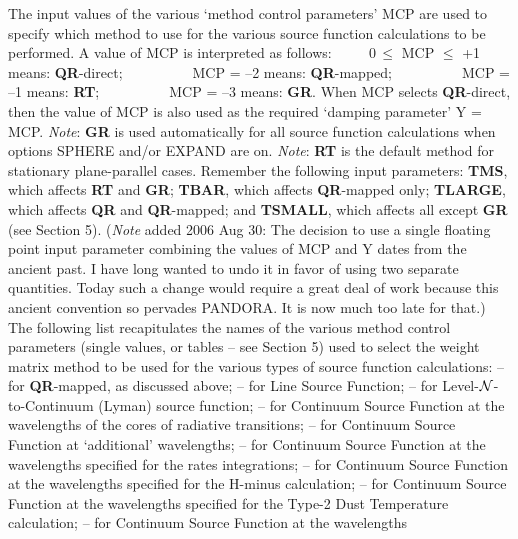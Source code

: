 The input values of the various `method control parameters' MCP are used
to specify which method to use for the various source function calculations
to be performed. A value of MCP is interpreted as follows: 
\blankline \noindent
$\qquad$ $0 \, \leq$ MCP $\leq$ +1 means: {\bf QR}-direct; \np
$\qquad$ $\phantom{0 \, \leq}$ MCP = --2 means: {\bf QR}-mapped; \np
$\qquad$ $\phantom{0 \, \leq}$ MCP = --1 means: {\bf RT}; \np
$\qquad$ $\phantom{0 \, \leq}$ MCP = --3 means: {\bf GR}.
\blankline 
{} When MCP selects {\bf QR}-direct, then the value of
MCP is also used as the required `damping parameter' Y = MCP. \np
{\it Note}: {\bf GR} is used automatically for all source
function calculations when options SPHERE and/or EXPAND are on. \np
{\it Note}: {\bf RT} is the default method for stationary
plane-parallel cases.
\blankline
Remember the following input parameters: {\bf TMS}, which affects
{\bf RT} and {\bf GR}; {\bf TBAR}, which affects {\bf QR}-mapped only;
{\bf TLARGE}, which affects {\bf QR} and {\bf QR}-mapped;
and {\bf TSMALL}, which affects all except {\bf GR} (see Section 5).
\blankline
({\it Note} added 2006 Aug 30: The decision to use a single floating
point input parameter combining the values of MCP and Y dates from the
ancient past. I have long wanted to undo it in favor of using two separate
quantities. Today such a change would require a great deal of work because
this ancient convention so pervades PANDORA. It is now much too late for that.)
\ej
The following list recapitulates the names of the various method control
parameters (single values, or tables -- see Section 5)
used to select the weight matrix
method to be used for the various types of source function calculations:
\blankline
{} -- for {\bf QR}-mapped, as discussed above;
\blankline
{} -- for Line Source Function;
\blankline
{} -- for Level-${\cal N}$-to-Continuum (Lyman) source function;
\blankline
{} -- for Continuum Source Function at the 
wavelengths of the cores of radiative transitions;
\blankline
{} -- for Continuum Source Function at `additional'
 wavelengths;
\blankline
{} -- for Continuum Source Function at the wavelengths 
specified for the rates integrations;
\blankline
{} -- for Continuum Source Function at the wavelengths
specified for the H-minus calculation;
\blankline
{} -- for Continuum Source Function at the wavelengths 
specified for the Type-2 Dust Temperature calculation;
\blankline
{} -- for Continuum Source Function at the wavelengths
